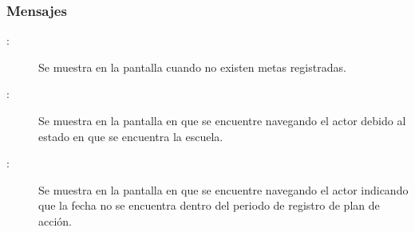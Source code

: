 \subsubsection{Mensajes}

	
\begin{description}
	\item[:] Se muestra en la pantalla  cuando no existen metas registradas.
	\item[:] Se muestra en la pantalla en que se encuentre navegando el actor debido al estado en que se encuentra la escuela.
	\item[:] Se muestra en la pantalla en que se encuentre navegando el actor indicando que la fecha no se encuentra dentro del periodo de registro de plan de acción.
\end{description}
